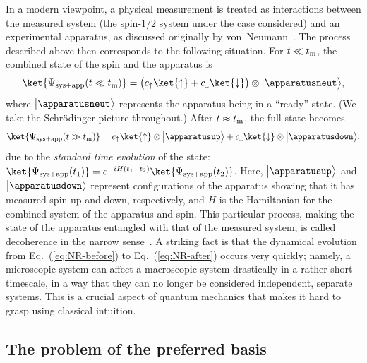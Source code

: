 \documentclass[12pt]{article}
\begin{document}
In a modern viewpoint, a physical measurement is treated as interactions 
between the measured system (the spin-$1/2$ system under the case 
considered) and an experimental apparatus, as discussed originally 
by von~Neumann~\cite{von_Neumann}.  The process described above then 
corresponds to the following situation.  For $t \ll t_{\rm m}$, the 
combined state of the spin and the apparatus is
%
\begin{equation}
  \ket{\Psi_{{\rm sys}+{\rm app}}(t \ll t_{\rm m})} 
  = \bigl( c_\uparrow \ket{\uparrow} + c_\downarrow \ket{\downarrow} \bigr) 
    \otimes \bigl|\apparatusneut\bigr>,
\label{eq:NR-before}
\end{equation}
%
where $\bigl|\apparatusneut\bigr>$ represents the apparatus being 
in a ``ready'' state.  (We take the Schr\"{o}dinger picture throughout.) 
After $t \approx t_{\rm m}$, the full state becomes
%
\begin{equation}
  \ket{\Psi_{{\rm sys}+{\rm app}}(t \gg t_{\rm m})} = 
    c_\uparrow \ket{\uparrow} \otimes \bigl|\apparatusup\bigr> 
    + c_\downarrow \ket{\downarrow} \otimes \bigl|\apparatusdown\bigr>,
\label{eq:NR-after}
\end{equation}
%
due to the {\it standard time evolution} of the state:\ 
$\ket{\Psi_{{\rm sys}+{\rm app}}(t_1)} = e^{-iH(t_1-t_2)} 
\break \ket{\Psi_{{\rm sys}+{\rm app}}(t_2)}$.  Here, $\bigl|\apparatusup\bigr>$ 
and $\bigl|\apparatusdown\bigr>$ represent configurations of the 
apparatus showing that it has measured spin up and down, respectively, 
and $H$ is the Hamiltonian for the combined system of the apparatus 
and spin.  This particular process, making the state of the apparatus 
entangled with that of the measured system, is called decoherence in the 
narrow sense~\cite{Schlosshauer}.  A striking fact is that the dynamical 
evolution from Eq.~(\ref{eq:NR-before}) to Eq.~(\ref{eq:NR-after}) 
occurs very quickly; namely, a microscopic system can affect a macroscopic 
system drastically in a rather short timescale, in a way that they can 
no longer be considered independent, separate systems.  This is a crucial 
aspect of quantum mechanics that makes it hard to grasp using classical 
intuition.


\subsection{The problem of the preferred basis}
\label{subsec:preferred-basis}
\end{document}
